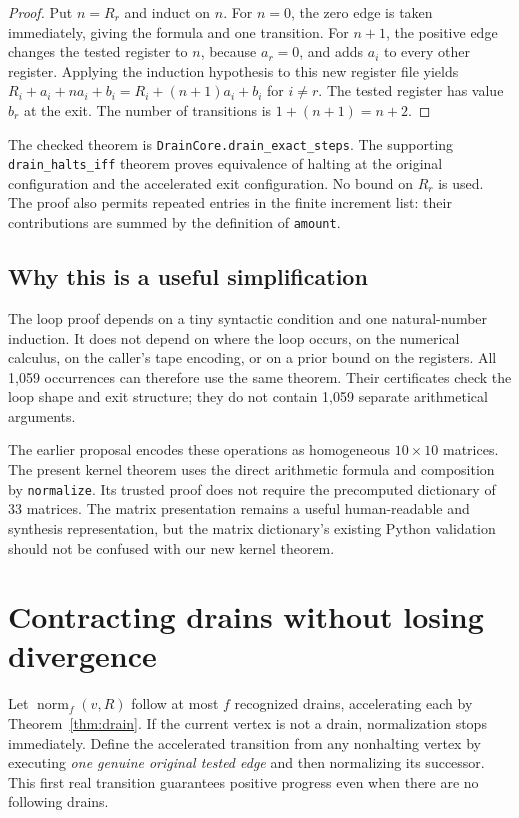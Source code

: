 \documentclass[11pt,letterpaper]{article}
\theoremstyle{definition}\newtheorem{definition}[theorem]{Definition}
\begin{document}
\begin{proof}
Put $n=R_r$ and induct on $n$. For $n=0$, the zero edge is taken immediately,
giving the formula and one transition. For $n+1$, the positive edge changes
the tested register to $n$, because $a_r=0$, and adds $a_i$ to every other
register. Applying the induction hypothesis to this new register file yields
$R_i+a_i+n a_i+b_i=R_i+(n+1)a_i+b_i$ for $i\ne r$. The tested register has
value $b_r$ at the exit. The number of transitions is $1+(n+1)=n+2$.
\end{proof}

The checked theorem is \texttt{DrainCore.drain\_exact\_steps}. The supporting
\texttt{drain\_halts\_iff} theorem proves equivalence of halting at the original
configuration and the accelerated exit configuration. No bound on $R_r$ is
used. The proof also permits repeated entries in the finite increment list:
their contributions are summed by the definition of \texttt{amount}.

\subsection{Why this is a useful simplification}

The loop proof depends on a tiny syntactic condition and one natural-number
induction. It does not depend on where the loop occurs, on the numerical
calculus, on the caller's tape encoding, or on a prior bound on the registers.
All 1,059 occurrences can therefore use the same theorem. Their certificates
check the loop shape and exit structure; they do not contain 1,059 separate
arithmetical arguments.

The earlier proposal encodes these operations as homogeneous $10\times10$
matrices. The present kernel theorem uses the direct arithmetic formula and
composition by \texttt{normalize}. Its trusted proof does not require the
precomputed dictionary of 33 matrices. The matrix presentation remains a useful
human-readable and synthesis representation, but the matrix dictionary's
existing Python validation should not be confused with our new kernel theorem.

\section{Contracting drains without losing divergence}

Let $\operatorname{norm}_f(v,R)$ follow at most $f$ recognized drains,
accelerating each by Theorem~\ref{thm:drain}. If the current vertex is not a
drain, normalization stops immediately. Define the accelerated transition from
any nonhalting vertex by executing \emph{one genuine original tested edge} and
then normalizing its successor. This first real transition guarantees positive
progress even when there are no following drains.
\end{document}
